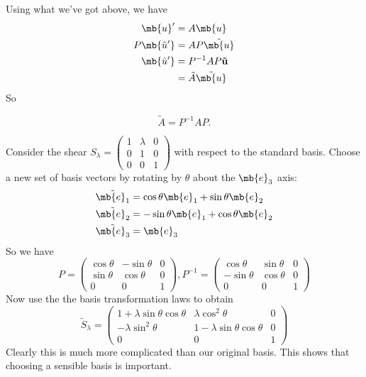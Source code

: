 \documentclass[a4paper]{article}
\begin{document}
Using what we've got above, we have
\begin{align*}
  \mb{u}' &= A\mb{u}\\
  P\mb{\tilde{u}'} &= AP\tilde{\mb{u}}\\
  \mb{\tilde{u}'} &= P^{-1}AP\mathbf{\tilde{u}}\\
  &= \tilde{A}\tilde{\mb{u}}
\end{align*}
So
\begin{thm}
  \[
  \tilde{A} = P^{-1}AP.
  \]
\end{thm}

\begin{eg}
  Consider the shear $S_\lambda = 
  \begin{pmatrix}
    1 & \lambda & 0\\
    0 & 1 & 0\\
    0 & 0 & 1
  \end{pmatrix}$ with respect to the standard basis. Choose a new set of basis vectors by rotating by $\theta$ about the $\mb{e}_3$ axis:
  \begin{align*}
    \tilde{\mb{e}_1} &= \cos\theta \mb{e}_1 + \sin\theta \mb{e}_2\\
    \tilde{\mb{e}_2} &= -\sin\theta \mb{e}_1 + \cos\theta \mb{e}_2\\
    \tilde{\mb{e}_3} &= \mb{e}_3
  \end{align*}
  So we have
  \[
  P = 
  \begin{pmatrix}
    \cos\theta  & -\sin\theta & 0\\
    \sin\theta & \cos\theta & 0\\
    0 & 0 & 1
  \end{pmatrix}, P^{-1} = 
  \begin{pmatrix}
    \cos\theta  & \sin\theta & 0\\
    -\sin\theta & \cos\theta & 0\\
    0 & 0 & 1
  \end{pmatrix}
  \]
  Now use the the basis transformation laws to obtain
  \[
  \tilde{S}_\lambda = 
  \begin{pmatrix}
    1 + \lambda\sin\theta\cos\theta & \lambda \cos^2\theta & 0\\
    -\lambda \sin^2\theta & 1 - \lambda\sin\theta\cos\theta & 0\\
    0 & 0 & 1
  \end{pmatrix}
  \]
  Clearly this is much more complicated than our original basis. This shows that choosing a sensible basis is important. 
\end{eg}
\end{document}
